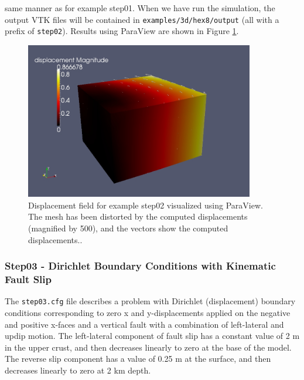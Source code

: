 same manner as for example step01. When we have run the simulation,
the output VTK files will be contained in \texttt{examples/3d/hex8/output}
(all with a prefix of \texttt{step02}). Results using ParaView are
shown in Figure \ref{fig:step02-displ}.
\begin{figure}
\centering{}\includegraphics[width=10cm]{tutorials/3dhex8/figs/step02-displ}\caption{Displacement field for example step02 visualized using ParaView. The
mesh has been distorted by the computed displacements (magnified by
500), and the vectors show the computed displacements.\label{fig:step02-displ}.}
\end{figure}



\subsubsection{Step03 - Dirichlet Boundary Conditions with Kinematic Fault Slip}

The \texttt{step03.cfg} file describes a problem with Dirichlet (displacement)
boundary conditions corresponding to zero x and y-displacements applied
on the negative and positive x-faces and a vertical fault with a combination
of left-lateral and updip motion. The left-lateral component of fault
slip has a constant value of 2 m in the upper crust, and then decreases
linearly to zero at the base of the model. The reverse slip component
has a value of 0.25 m at the surface, and then decreases linearly
to zero at 2 km depth.

